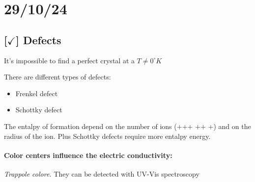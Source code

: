 \section{29/10/24}

\subsection{[$\checkmark$] Defects}

It's impossible to find a perfect crystal at a $T \neq 0^{\circ}K$

\vspace{10pt}

\noindent There are different types of defects:

\begin{itemize}
    \item Frenkel defect
    \item Schottky defect
\end{itemize}

The entalpy of formation depend on the number of ions (+++ ++ +) and on the radius of the ion. Plus Schottky defects require more entalpy energy. 

\paragraph{Color centers influence the electric conductivity:} \textit{Trappole colore.} They can be detected with UV-Vis spectroscopy

